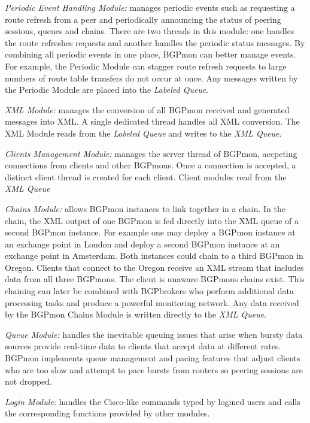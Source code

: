 \emph{Periodic Event Handling Module:}  manages periodic events such as requesting a route refresh from a peer and periodically 
announcing the status of peering sessions, queues and chains.  There are two threads in this module: one handles the route refreshes requests and another handles the periodic status messages.  By combining all periodic events in one place,  BGPmon can better manage events.   For example, the Periodic Module can stagger route refresh requests to large numbers of route table transfers do not occur at once.    Any messages written by the Periodic Module are placed into the \emph{Labeled Queue}.

\emph{XML Module:}  manages the conversion of all BGPmon received and generated messages into XML. 
A single dedicated thread handles all XML conversion.   The XML Module reads from the \emph{Labeled Queue} and writes to the \emph{XML Queue}.  

\emph{Clients Management Module:}  manages the server thread of BGPmon, accpeting connections from clients
and other BGPmons.   Once a connection is accepted, a distinct client thread is created for each client.     Client modules read from the \emph{XML Queue}

\emph{Chains Module:}  allows BGPmon instances to link together in a chain.    In the chain, the XML output of one BGPmon is fed directly into the XML queue of a second BGPmon instance.      For example one may deploy a BGPmon instance at an exchange point in London and deploy a second BGPmon instance at an exchange point in Amsterdam.   Both instances could chain to a third BGPmon in Oregon.    Clients that connect to the Oregon receive an XML stream that includes data from all three BGPmons.   The client is unaware BGPmons chains exist.    This chaining can later be combined with BGPbrokers who perform additional data processing tasks and produce a powerful monitoring network.    Any data received by the BGPmon Chains Module is written directly to the \emph{XML Queue}.
 
\emph{ Queue Module:}   handles the inevitable queuing issues that arise when bursty data sources provide real-time data to clients that accept data at different rates.    BGPmon implements queue management and pacing features that adjust clients who are too slow and attempt to pace bursts from routers so peering sessions are not dropped.
  
\emph{ Login Module:}   handles the Cisco-like commands typed by logined users and calls the corresponding functions provided by other modules.



